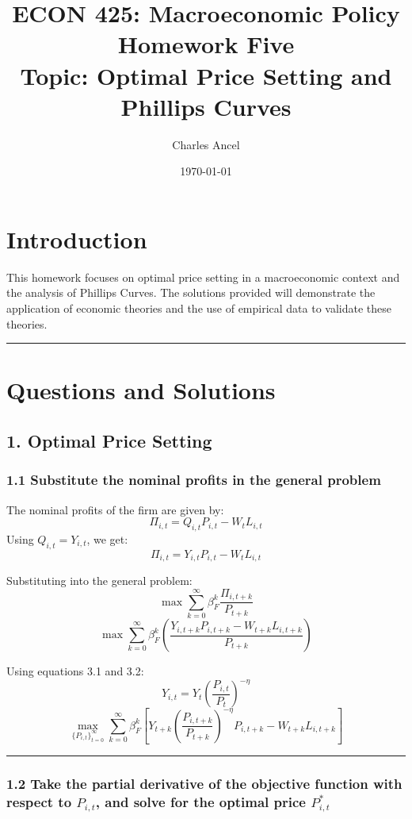 \documentclass{article}
\title{ECON 425: Macroeconomic Policy\\\large Homework Five\\Topic: Optimal Price Setting and Phillips Curves}
\author{Charles Ancel}
\date{\today}
\begin{document}
\maketitle

\section{Introduction}

This homework focuses on optimal price setting in a macroeconomic context and the analysis of Phillips Curves. The solutions provided will demonstrate the application of economic theories and the use of empirical data to validate these theories.

\noindent\rule{\linewidth}{1pt}

\section{Questions and Solutions}

\subsection*{1. Optimal Price Setting}

\subsubsection*{1.1 Substitute the nominal profits in the general problem}

The nominal profits of the firm are given by:
\[
\Pi_{i,t} = Q_{i,t} P_{i,t} - W_t L_{i,t}
\]
Using \(Q_{i,t} = Y_{i,t}\), we get:
\[
\Pi_{i,t} = Y_{i,t} P_{i,t} - W_t L_{i,t}
\]

Substituting into the general problem:
\[
\max \sum_{k=0}^{\infty} \beta_F^k \frac{\Pi_{i,t+k}}{P_{t+k}}
\]
\[
\max \sum_{k=0}^{\infty} \beta_F^k \left( \frac{Y_{i,t+k} P_{i,t+k} - W_{t+k} L_{i,t+k}}{P_{t+k}} \right)
\]

Using equations 3.1 and 3.2:
\[
Y_{i,t} = Y_t \left( \frac{P_{i,t}}{P_t} \right)^{-\eta}
\]
\[
\max_{ \{P_{i,t}\}_{t=0}^{\infty} } \sum_{k=0}^{\infty} \beta_F^k \left[ Y_{t+k} \left( \frac{P_{i,t+k}}{P_{t+k}} \right)^{-\eta} P_{i,t+k} - W_{t+k} L_{i,t+k} \right]
\]

\noindent\rule{\linewidth}{0.5pt}

\subsubsection*{1.2 Take the partial derivative of the objective function with respect to \( P_{i,t} \), and solve for the optimal price \( P_{i,t}^* \)}
\end{document}
